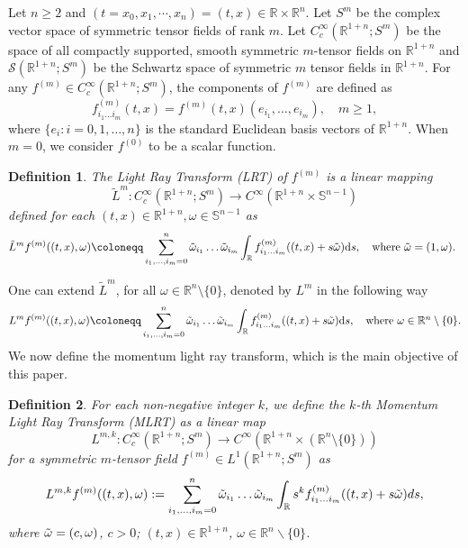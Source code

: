 \documentclass[11pt,a4paper,reqno]{amsart}
\newtheorem{definition}{Definition}[section]
\newcommand{\Rn}{\mathbb{R}^n}
\newcommand{\R}{\mathbb{R}}
\newcommand{\D}{\mathrm{d}}
\newcommand{\om}{\omega}
\newcommand{\sn}{\mathbb{S}^{n-1}}
\newcommand{\Rno}{\mathbb{R}^{1+n}}
\begin{document}
Let $n\geq 2$ and $(t=x_0, x_1, \cdots, x_n)=(t,x)\in \R\times\Rn$. Let $S^m$ be the complex vector space of symmetric tensor fields of rank $m$. Let $C_{c}^{\infty}(\mathbb{R}^{1+n};S^m)$ be the space of all compactly supported, smooth symmetric $m$-tensor fields on $\mathbb{R}^{1+n}$ and $\mathcal{S}(\Rno; S^m)$ be the Schwartz space of symmetric $m$ tensor fields in $\Rno$.  For any $f^{(m)} \in C_{c}^{\infty}(\mathbb{R}^{1+n};S^m)$, the components of $f^{(m)}$ are defined as 
	\[
	f^{(m)}_{i_1\dots i_m}(t,x)=f^{(m)}(t,x)(e_{i_1},\dots,e_{i_m}), \quad m\ge 1,
	\]
	where $\{e_i:i=0,1,\dots,n\}$ is the standard Euclidean basis vectors of $\R^{1+n}$.  When $m=0$, we consider $f^{(0)}$ to be a scalar  function.

    \begin{definition}\cite{ramm1991inverse}\label{def_lrt_1}
		The \emph{Light Ray Transform (LRT)} of $f^{(m)}$ is a linear mapping 
		\[ \tilde{L}^m: C_{c}^{\infty}(\mathbb{R}^{1+n};S^m) \longrightarrow C^{\infty}(\mathbb{R}^{1+n}\times\sn) \]
		defined for each $(t,x)\in \Rno, \omega \in \sn$ as
		\begin{equation}\label{def_lrt}
			\tilde{L}^{m}f^{(m)}((t,x),\omega)\coloneqq \sum_{i_{1},\dots,i_{m}=0}^{n}\Tilde{\omega}_{i_{1}}\dots \Tilde{\omega}_{i_{m}}\int_{\mathbb{R}}f_{i_{1}\dots i_{m}}^{(m)}((t,x)+s\Tilde{\omega})\D s , \quad \mbox{where $\Tilde{\omega}=(1,\omega)$. }
		\end{equation}
	\end{definition}
	One can extend  $\tilde{L}^m$, for all $\om \in \R^{n}\setminus\{0\}$, denoted by $L^m$ in the following way 
	\begin{equation}\label{def_extended_lrt}
		L^{m}f^{(m)}((t,x),\omega)\coloneqq \sum_{i_{1},\dots,i_{m}=0}^{n}\Tilde{\omega}_{i_{1}}\dots \Tilde{\omega}_{i_{m}}\int_{\mathbb{R}}f_{i_{1}\dots i_{m}}^{(m)}((t,x)+s\Tilde{\omega})\D s , \quad\mbox{where $\omega\in \Rn\setminus\{0\}$}.
	\end{equation}
	We now define the momentum light ray transform, which is the main objective of this paper.
	\begin{definition}
	For each non-negative integer $k$, we define the $k$-th \emph{Momentum Light Ray Transform (MLRT)} as a linear map
		\[
		L^{m,k}: C_{c}^{\infty}(\mathbb{R}^{1+n};S^m) \longrightarrow C^{\infty}(\mathbb{R}^{1+n}\times(\R^{n}\setminus\{0\}))
		\]
		for a symmetric $m$-tensor field $f^{(m)} \in L^1(\R^{1+n};S^m)$ as
		\begin{equation}\label{def_mlrt}
			L^{m,k}f^{(m)}((t,x),\om) := \sum_{i_{1},\dots,i_{m}=0}^{n}\Tilde{\omega}_{i_{1}}\dots \Tilde{\omega}_{i_{m}}\int_{\mathbb{R}}s^kf_{i_{1}\dots i_{m}}^{(m)}((t,x)+s\Tilde{\omega})ds ,
		\end{equation}
		where $\Tilde{\omega}=(c,\omega)$, $c>0$; $(t,x)\in \mathbb{R}^{1+n}$, $\omega \in \mathbb{R}^{n}\backslash\{0\}$. 
	\end{definition}
\end{document}
